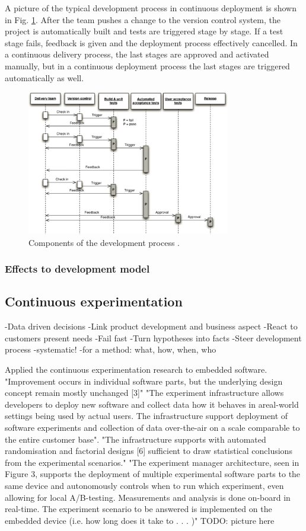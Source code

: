 \documentclass[english]{tktltiki2}
\theoremstyle{definition}
\theoremstyle{remark}
\begin{document}
A picture of the typical development process in continuous deployment is shown in Fig. \ref{fig3}. After the team pushes a change to the version control system, the project is automatically built and tests are triggered stage by stage. If a test stage fails, feedback is given and the deployment process effectively cancelled. In a continuous delivery process, the last stages are approved and activated manually, but in a continuous deployment process the last stages are triggered automatically as well.

\begin{figure}[!t]
	\centering
	\includegraphics[width=3.5in]{developmentprocess.jpg}
	\caption{Components of the development process \cite{cdbook}.}
	\label{fig3}
\end{figure}

\subsubsection{Effects to development model}

\subsection{Continuous experimentation}

-Data driven decisions
-Link product development and business aspect
-React to customers present needs
-Fail fast
-Turn hypotheses into facts
-Steer development process
-systematic!
-for a method: what, how, when, who

\cite{eklund2012architecture}
Applied the continuous experimentation research to embedded software.
"Improvement occurs in individual software parts, but the underlying design concept remain mostly unchanged [3]"
"The experiment infrastructure allows developers to deploy new software and collect data how it behaves in areal-world settings being used by actual users. The infrastructure support deployment of software experiments and collection of data over-the-air on a scale comparable to the entire customer base". 
"The infrastructure supports with automated randomisation and factorial designs [6] sufficient to draw statistical conclusions from the experimental scenarios."
"The experiment manager architecture, seen in Figure 3, supports the deployment of multiple experimental software parts to the same device and autonomously controls when to run which experiment, even allowing for local A/B-testing. Measurements and analysis is done on-board in real-time. The experiment scenario to be answered is implemented on the embedded device (i.e. how long does it take to . . . )"
TODO: picture here
\end{document}
